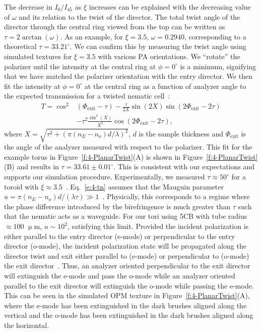 The decrease in $I_0/I_{45}$ as $\xi$ increases can be explained with the decreasing value of $\omega$ and its relation to the twist of the director.
The total twist angle of the director through the central ring viewed from the top can be written as $\tau = 2 \arctan (\omega)$.
As an example, for $\xi = 3.5$, $\omega = 0.2940$, corresponding to a theoretical $\tau = 33.21^{\circ}$.
We can confirm this by measuring the twist angle using simulated textures for $\xi=3.5$ with various PA orientations.
We ``rotate'' the polarizer until the intensity at the central ring at $\phi=0^{\circ}$ is a minimum, signifying that we have matched the polarizer orientation with the entry director.
We then fit the intensity at $\phi=0^{\circ}$ at the central ring as a function of analyzer angle to the expected transmission for a twisted nematic cell~\cite{RN232}:
\begin{align}\label{e:4-tn}
T = \cos ^2&(\Phi_{\textrm{exit}}-\tau)-\frac{\tau}{2 X}\sin(2X)\sin(2\Phi_{\textrm{exit}}-2\tau)\nonumber \\
&-\tau ^2\frac{\sin ^2 (X)}{X^2}\cos(2\Phi_{\textrm{exit}}-2\tau),
\end{align}
where $X = \sqrt{\tau^2+(\pi(n_E-n_o)d/\lambda)^2}$, $d$ is the sample thickness and $\Phi_\textrm{exit}$ is the angle of the analyzer measured with respect to the polarizer.
This fit for the example torus in Figure~\ref{f:4-PlanarTwist}(A) is shown in Figure~\ref{f:4-PlanarTwist}(B) and results in $\tau=33.61 \pm 0.01^{\circ}$.
This is consistent with our expectations and supports our simulation procedure.
Experimentally, we measured $\tau \approx 50^{\circ}$ for a toroid with $\xi \approx 3.5$~\cite{RN24}. Eq.~\ref{e:4-tn} assumes that the Mauguin parameter $u =  \pi (n_E-n_o) d /(\lambda \tau) \gg 1$~\cite{RN232}.
 Physically, this corresponds to a regime where the phase difference introduced by the birefringence is much greater than $\tau$ such that the nematic acts as a waveguide.
For our tori using 5CB with tube radius $\approx 100$ $\upmu$m, $u\sim 10^{2}$, satisfying this limit.
Provided the incident polarization is either parallel to the entry director (e-mode) or perpendicular to the entry director (o-mode), the incident polarization state will be propagated along the director twist and exit either parallel to (e-mode) or perpendicular to (o-mode) the exit director~\cite{RN232}.
Thus, an analyzer oriented perpendicular to the exit director will extinguish the e-mode and pass the o-mode while an analyzer oriented parallel to the exit director will extinguish the o-mode while passing the e-mode.
This can be seen in the simulated OPM texture in Figure~\ref{f:4-PlanarTwist}(A), where the e-mode has been extinguished in the dark brushes aligned along the vertical and the o-mode has been extinguished in the dark brushes aligned along the horizontal.


